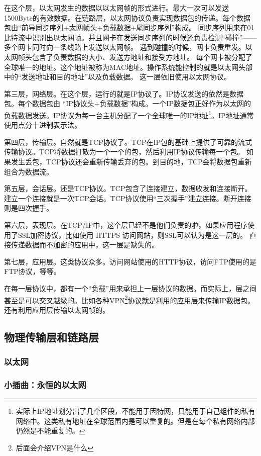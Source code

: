在这个层，以太网发生的数据以以太网帧的形式进行。最大一次可以发送 1500Byte的有效数据。在链路层，以太网协议负责实现数据包的传递。每个数据包由“前导同步序列+太网帧头+负载数据+尾同步序列”构成。
同步序列用来在01比特流中识别出以太网帧。并且网卡在发送同步序列的时候还负责检测“碰撞”——多个网卡同时向一条线路上发送以太网帧。
遇到碰撞的时候，网卡负责重发。以太网帧头包含了负责数据的大小、发送方地址和接受方地址。
每个网卡被分配了全球唯一的地址。这个地址被称为MAC地址。操作系统能控制的就是以太网头部中的“发送地址和目的地址”以及负载数据。
这一层依旧使用以太网协议。

第三层，网络层。在这个层，运行的就是IP协议了。IP协议发送的依然是数据包。每个数据包由 “IP协议头+负载数据”构成。一个IP数据包正好作为以太网的负载数据发送。IP协议为每一台主机分配了一个全球唯一的IP地址\footnote{实际上IP地址划分出了几个区段，不能用于因特网，只能用于自己组件的私有网络中。这类私有地址在全球范围内是可以重复的。但是在每个私有网络内部仍然是不能重复的。}。IP地址通常使用点分十进制表示法。

第四层，传输层。自然就是TCP协议了。TCP在IP包的基础上提供了可靠的流式传输协议。TCP将数据打散为一个一个的包，然后利用IP协议传输每一个包。
如果发生丢包，TCP协议还会重新传输丢弃的包。到目的地，TCP会将数据包重新组合为数据流。

第五层，会话层。还是TCP协议。TCP包含了连接建立，数据收发和连接断开。建立一个连接就是一次TCP会话。TCP协议使用“三次握手”建立连接。断开连接则是四次握手。

第六层，表现层。在TCP/IP中，这个层已经不是他们负责的啦。如果应用程序使用了SSL加密协议，比如使用 HTTPS 访问网站，则SSL可以认为是这一层的。
直接传递数据而不加密的应用中，这一层是缺失的。

第七层，应用层。这类协议众多。访问网站使用的HTTP协议，访问FTP使用的是FTP协议，等等。

在每一层协议中，都有一个“负载”用来承担上一层协议的数据。而实际上，层之间甚至是可以交叉越级的。比如各种VPN\footnote{后面会介绍VPN是什么}协议就是利用的应用层来传输IP数据包。还有利用应用层传输以太网帧的。

\subsection{物理传输层和链路层}

\subsubsection{以太网}

\subsubsection*{小插曲：永恒的以太网}

